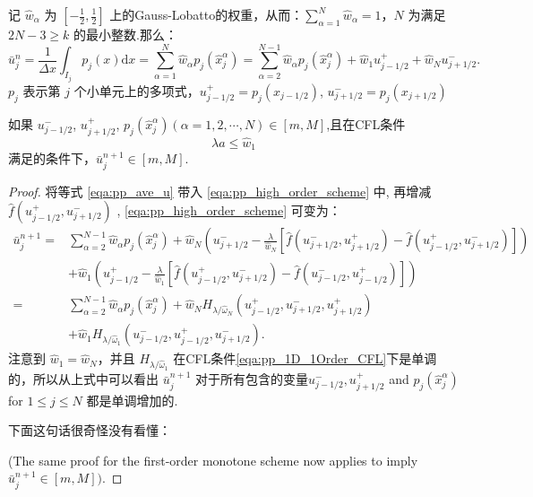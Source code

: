 \documentclass{book}
\begin{document}
记 $\hat{w}_{\alpha}$ 为 $\left[-\frac{1}{2}, \frac{1}{2}\right]$ 上的Gauss-Lobatto的权重，从而：$\sum_{\alpha=1}^{N} \hat{w}_{\alpha}=1$，$N$ 为满足 $2 N-3 \geqslant k$ 的最小整数.那么：
\begin{equation}
  \label{eqa:pp_ave_u}
  \bar{u}_{j}^{n}=\frac{1}{\Delta x} \int_{I_{j}} p_{j}(x) \mathrm{d} x=\sum_{\alpha=1}^{N} \hat{w}_{\alpha} p_{j}\left(\hat{x}_{j}^{\alpha}\right)=\sum_{\alpha=2}^{N-1} \hat{w}_{\alpha} p_{j}\left(\hat{x}_{j}^{\alpha}\right)+\hat{w}_{1} u_{j-1 / 2}^{+}+\hat{w}_{N} u_{j+1 / 2}^{-} .
\end{equation}
$p_j$ 表示第 $j$ 个小单元上的多项式，$u_{j-1/2}^+=p_j(x_{j-1/2})$, $u_{j+1/2}^-=p_j(x_{j+1/2})$
\begin{theorem}{}{}
  如果 $u_{j-1/2}^-$, $u_{j+1/2}^+$, $p_j(\hat{x}_j^\alpha)(\alpha=1,2,\cdots,N)\in[m,M]$,且在CFL条件
  \begin{equation}
    \lambda a \leq \hat{w}_{1}
  \end{equation}
  满足的条件下，$\bar{u}_j^{n+1}\in[m,M]$.
\end{theorem}
\begin{proof}
  将等式 \eqref{eqa:pp_ave_u} 带入 \eqref{eqa:pp_high_order_scheme} 中, 再增减  $\hat{f}\left(u_{j-1 / 2}^{+}, u_{j+1 / 2}^{-}\right)$ , \eqref{eqa:pp_high_order_scheme} 可变为：
  \begin{equation}
    \begin{aligned}
      \bar{u}_{j}^{n+1}= & \sum_{\alpha=2}^{N-1} \hat{w}_{\alpha} p_{j}\left(\hat{x}_{j}^{\alpha}\right)+\hat{w}_{N}\left(u_{j+1 / 2}^{-}-\frac{\lambda}{\hat{w}_{N}}\left[\hat{f}\left(u_{j+1 / 2}^{-}, u_{j+1 / 2}^{+}\right)-\hat{f}\left(u_{j-1 / 2}^{+}, u_{j+1 / 2}^{-}\right)\right]\right) \\
                         & +\hat{w}_{1}\left(u_{j-1 / 2}^{+}-\frac{\lambda}{\hat{w}_{1}}\left[\hat{f}\left(u_{j-1 / 2}^{+}, u_{j+1 / 2}^{-}\right)-\hat{f}\left(u_{j-1 / 2}^{-}, u_{j-1 / 2}^{+}\right)\right]\right)                                                                              \\
      =                  & \sum_{\alpha=2}^{N-1} \hat{w}_{\alpha} p_{j}\left(\hat{x}_{j}^{\alpha}\right)+\hat{w}_{N} H_{\lambda / \hat{\omega}_{N}}\left(u_{j-1 / 2}^{+}, u_{j+1 / 2}^{-}, u_{j+1 / 2}^{+}\right)                                                                                  \\
                         & +\hat{w}_{1} H_{\lambda / \hat{\omega}_{1}}\left(u_{j-1 / 2}^{-}, u_{j-1 / 2}^{+}, u_{j+1 / 2}^{-}\right) .
    \end{aligned}
  \end{equation}
  注意到  $\hat{w}_{1}=\hat{w}_{N}$，并且 $H_{\lambda / \hat{\omega}_{1}}$  在CFL条件\eqref{eqa:pp_1D_1Order_CFL}下是单调的，所以从上式中可以看出 $\bar{u}_{j}^{n+1}$  对于所有包含的变量$u_{j-1 / 2}^{-}, u_{j+1 / 2}^{+}$ and  $p_{j}\left(\hat{x}_{j}^{\alpha}\right)$  for  $1 \leq j \leq N$ 都是单调增加的.

  下面这句话很奇怪没有看懂：

  (The same proof for the first-order monotone scheme now applies to imply  $\bar{u}_{j}^{n+1} \in[m, M])$.
\end{proof}
\end{document}
